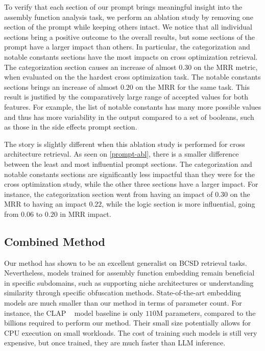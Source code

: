 To verify that each section of our prompt brings meaningful insight into the assembly function analysis task, we perform an ablation
study by removing one section of the prompt while keeping others intact. We notice that all individual sections bring a positive
outcome to the overall results, but some sections of the prompt have a larger impact than others. In particular, the categorization and
notable constants sections have the most impacts on cross optimization retrieval. The categorization section causes an increase of almost
\(0.30\) on the MRR metric, when evaluated on the the hardest cross optimization task. The notable constants sections brings an increase of
almost \(0.20\) on the MRR for the same task. This result is justified by the comparatively large range of accepted values for both features.
For example, the list of notable constants has many more possible values and thus has more variability in the output compared to a set
of booleans, such as those in the side effects prompt section.

The story is slightly different when this ablation study is performed for cross architecture retrieval. As seen on \autoref{prompt-abl},
there is a smaller difference between the least and most influential prompt sections. The categorization and notable constants sections
are significantly less impactful than they were for the cross optimization study, while the other three sections have a larger impact.
For instance, the categorization section went from having an impact of \(0.30\) on the MRR to having an impact \(0.22\), while the logic
section is more influential, going from \(0.06\) to \(0.20\) in MRR impact.

\subsection{Combined Method}

Our method has shown to be an excellent generalist on BCSD retrieval tasks. Nevertheless, models trained for assembly function embedding
remain beneficial in specific subdomains, such as supporting niche architectures or understanding similarity through
specific obfuscation methods. State-of-the-art embedding models are much smaller than our method in terms of parameter count.
For instance, the CLAP ~\cite{CLAP} model baseline is only \(110\)M parameters, compared to the billions required to perform our method.
Their small size potentially allows for CPU execution on small workloads. The cost of training such models is still very expensive,
but once trained, they are much faster than LLM inference.

